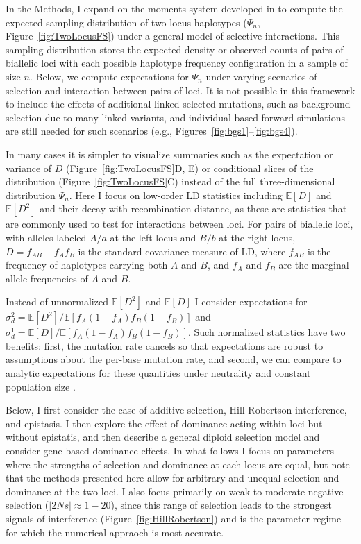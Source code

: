 \documentclass[]{article}
\newcommand{\E}{\mathbb{E}}
\begin{document}
In the Methods, I expand on the moments system developed in
\citet{Ragsdale2019-nt} to compute the expected sampling distribution of
two-locus haplotypes (\(\Psi_n\), Figure~\ref{fig:TwoLocusFS}) under a general
model of selective interactions. This sampling distribution stores the expected
density or observed counts of pairs of biallelic loci with each possible
haplotype frequency configuration in a sample of size \(n\). Below, we compute
expectations for \(\Psi_n\) under varying scenarios of selection and
interaction between pairs of loci. It is not possible in this framework to
include the effects of additional linked selected mutations, such as background
selection due to many linked variants, and individual-based forward simulations
are still needed for such scenarios (e.g.,
Figures~\ref{fig:bgs1}--\ref{fig:bgs4}).

In many cases it is simpler to visualize summaries such as the expectation or
variance of \(D\) (Figure~\ref{fig:TwoLocusFS}D, E) or conditional slices of
the distribution (Figure~\ref{fig:TwoLocusFS}C) instead of the full
three-dimensional distribution \(\Psi_n\). Here I focus on low-order LD
statistics including \(\E[D]\) and \(\E[D^2]\) and their decay with
recombination distance, as these are statistics that are commonly used to test
for interactions between loci. For pairs of biallelic loci, with alleles
labeled \(A/a\) at the left locus and \(B/b\) at the right locus,
\(D=f_{AB}-f_A f_B\) is the standard covariance measure of LD, where \(f_{AB}\)
is the frequency of haplotypes carrying both \(A\) and \(B\), and \(f_A\) and
\(f_B\) are the marginal allele frequencies of \(A\) and \(B\).

Instead of unnormalized \(\E[D^2]\) and \(\E[D]\) I consider expectations for
\(\sigma_d^2 = \E[D^2]/\E[f_A(1-f_A)f_B(1-f_B)]\) and \(\sigma_d^1 =
\E[D]/\E[f_A(1-f_A)f_B(1-f_B)]\).  Such normalized statistics have two
benefits: first, the mutation rate cancels so that expectations are robust to
assumptions about the per-base mutation rate, and second, we can compare to
analytic expectations for these quantities under neutrality and constant
population size \citep{Ohta1971-yd}.

Below, I first consider the case of additive selection, Hill-Robertson
interference, and epistasis. I then explore the effect of dominance acting
within loci but without epistatis, and then describe a general diploid
selection model and consider gene-based dominance effects. In what follows I
focus on parameters where the strengths of selection and dominance at each
locus are equal, but note that the methods presented here allow for arbitrary
and unequal selection and dominance at the two loci. I also focus primarily on
weak to moderate negative selection (\(|2Ns| \approx 1 - 20\)), since this
range of selection leads to the strongest signals of interference
(Figure~\ref{fig:HillRobertson}) and is the parameter regime for which the
numerical appraoch is most accurate.
\end{document}
